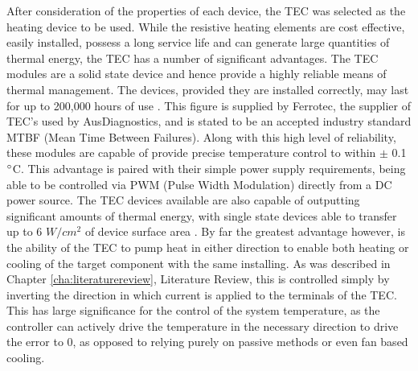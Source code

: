 After consideration of the properties of each device, the TEC was selected as the heating device to be used. While the resistive heating elements are cost effective, easily installed, possess a long service life and can generate large quantities of thermal energy, the TEC has a number of significant advantages. The TEC modules are a solid state device and hence provide a highly reliable means of thermal management. The devices, provided they are installed correctly, may last for up to 200,000 hours of use \cite{Ferroteclife}. This figure is supplied by Ferrotec, the supplier of TEC's used by AusDiagnostics, and is stated to be an accepted industry standard MTBF (Mean Time Between Failures). Along with this high level of reliability, these modules are capable of provide precise temperature control to within $\pm$ 0.1$\degree$C. This advantage is paired with their simple power supply requirements, being able to be controlled via PWM (Pulse Width Modulation) directly from a DC power source. The TEC devices available are also capable of outputting significant amounts of thermal energy, with single state devices able to transfer up to 6 $W/cm^2$ of device surface area \cite{Ferroteclife}. By far the greatest advantage however, is the ability of the TEC to pump heat in either direction to enable both heating or cooling of the target component with the same installing. As was described in Chapter \ref{cha:literaturereview}, Literature Review, this is controlled simply by inverting the direction in which current is applied to the terminals of the TEC. This has large significance for the control of the system temperature, as the controller can actively drive the temperature in the necessary direction to drive the error to 0, as opposed to relying purely on passive methods or even fan based cooling.\\

